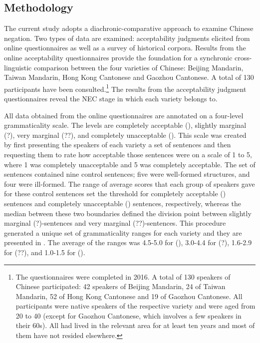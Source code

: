 \documentclass[output=paper]{langscibook}
\begin{document}
\subsection{Methodology}\label{s:lam2-2}

The current study adopts a diachronic-comparative approach to examine Chinese negation. Two types of data are examined: acceptability judgments elicited from online questionnaires as well as a survey of historical corpora. Results from the online acceptability questionnaires provide the foundation for a synchronic cross-linguistic comparison between the four varieties of Chinese: Beijing Mandarin, Taiwan Mandarin, Hong Kong Cantonese and Gaozhou Cantonese. A total of 130 participants have been consulted.\footnote{The questionnaires were completed in 2016. A total of 130 speakers of Chinese participated: 42 speakers of Beijing Mandarin, 24 of Taiwan Mandarin, 52 of Hong Kong Cantonese and 19 of Gaozhou Cantonese. All participants were native speakers of the respective variety and were aged from 20 to 40 (except for Gaozhou Cantonese, which involves a few speakers in their 60s). All had lived in the relevant area for at least ten years and most of them have not resided elsewhere.} 
The results from the acceptability judgment questionnaires reveal the NEC stage in which each variety belongs to. 

All data obtained from the online questionnaires are annotated on a four-level grammaticality scale. The levels are completely acceptable (), slightly marginal (?), very marginal (??), and completely unacceptable (\ast). 
This scale was created by first presenting the speakers of each variety a set of sentences and then requesting them to rate how acceptable those sentences were on a scale of 1 to 5, where 1 was completely unacceptable and 5 was completely acceptable. The set of sentences contained nine control sentences; five were well-formed structures, and four were ill-formed. The range of average scores that each group of speakers gave for these control sentences set the threshold for completely acceptable () sentences and completely unacceptable (\ast) sentences, respectively, whereas the median between these two boundaries defined the division point between slightly marginal (?)-sentences and very marginal (??)-sentences. This procedure generated a unique set of grammaticality ranges for each variety and they are presented in . The average of the ranges was 4.5-5.0 for (), 3.0-4.4 for (?), 1.6-2.9 for (??), and 1.0-1.5 for (\ast).
\end{document}
